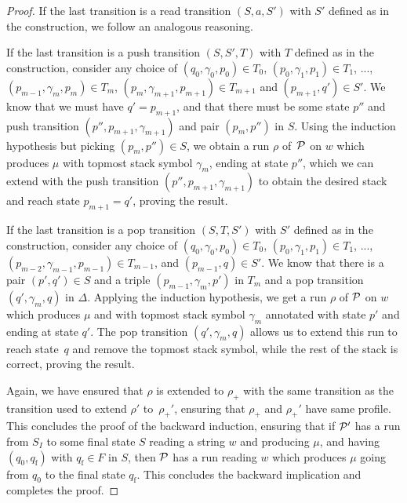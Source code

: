 \begin{proof}
        If the last transition is a read transition $(S, a, S')$ with $S'$
        defined as in the construction, we follow an analogous reasoning.

        If the last transition is a push transition $(S, S', T)$ with $T$ defined as
        in the construction, consider any choice of 
        $(q_0, \gamma_0, p_0) \in T_0$,
        $(p_0, \gamma_1, p_1) \in T_1$, ..., $(p_{m-1}, \gamma_m, p_m) \in T_m$,
        $(p_m, \gamma_{m+1}, p_{m+1}) \in T_{m+1}$ and $(p_{m+1}, q') \in S'$. We
        know that we must have $q' = p_{m+1}$, 
        and that there must be
        some state $p''$ and push transition $(p'', p_{m+1}, \gamma_{m+1})$ and
        pair $(p_m, p'')$ in $S$. Using the induction hypothesis but picking
        $(p_m, p'') \in S$, we obtain a run $\rho$ of~$\mathcal{P}$ on $w$ which produces $\mu$ with topmost stack symbol $\gamma_m$, ending at
        state $p''$, which we can extend with the push transition $(p'',
        p_{m+1}, \gamma_{m+1})$ to obtain the desired stack and reach state
        $p_{m+1} = q'$, proving the result.

        If the last transition is a pop transition $(S, T, S')$ with $S'$ defined
        as in the construction, consider any choice of 
        $(q_0, \gamma_0, p_0) \in T_0$,
        $(p_0, \gamma_1, p_1) \in T_1$, ..., $(p_{m-2}, \gamma_{m-1}, p_{m-1})
        \in T_{m-1}$, and $(p_{m-1}, q) \in S'$. We know that there is a pair
        $(p', q') \in S$ and a triple $(p_{m-1}, \gamma_m, p')$ in $T_m$ and a
        pop transition $(q', \gamma_m, q)$ in $\Delta$. Applying the induction
        hypothesis, we get a run $\rho$ of $\mathcal{P}$ on $w$ which produces $\mu$ and with topmost stack symbol $\gamma_m$ annotated with state
        $p'$ and ending at state $q'$. The pop transition $(q', \gamma_m, q)$
        allows us to extend this run to reach state~$q$ and remove the topmost
        stack symbol, while the rest of the stack is correct, proving the
        result.

        Again, we have ensured that $\rho$ is extended to $\rho_+$ with the same
        transition as the transition used to extend $\rho'$ to~$\rho_+'$,
        ensuring that $\rho_+$ and $\rho_+'$ have same profile.
        This concludes the proof of the backward induction, ensuring that
        if $\mathcal{P}'$ has a run from $S_I$ to some final state $S$ reading a string $w$ and producing $\mu$, and having $(q_0, q_{\mathrm{f}})$
        with $q_{\mathrm{f}} \in
        F$ in $S$, then $\mathcal{P}$ has a run reading $w$ which produces $\mu$ going from $q_0$ to the final state $q_{\mathrm{f}}$. This concludes the
        backward implication and completes the proof.
\end{proof}

